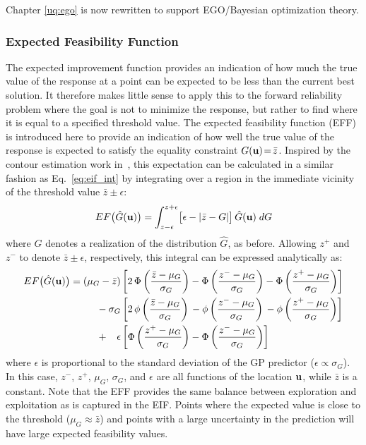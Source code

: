 Chapter \ref{uq:ego} is now rewritten to support EGO/Bayesian optimization theory.

\subsubsection{Expected Feasibility Function}\label{uq:reliability:global:ego:eff}

The expected improvement function provides an indication of how much the true
value of the response at a point can be expected to be less than the current 
best solution.
It therefore makes little sense to apply this to the forward reliability problem 
where the goal is not to minimize the response, but rather to find where it is 
equal to a specified threshold value.
The expected feasibility function (EFF) is introduced here to provide an 
indication of how well the true value of the response is expected to satisfy 
the equality constraint $G({\bf u})\!=\!\bar{z}$.
Inspired by the contour estimation work in~\cite{Ran08}, this 
expectation can be calculated in a similar fashion as Eq.~\ref{eq:eif_int}
by integrating over a region in the immediate vicinity of the threshold value 
$\bar{z}\pm\epsilon$:
\begin{equation}
EF\bigl( \hat{G}({\bf u}) \bigr) = 
  \int_{z-\epsilon}^{z+\epsilon} 
    \bigl[ \epsilon - | \bar{z}-G | \bigr] \, \hat{G}({\bf u}) \; dG
\end{equation}
\noindent where $G$ denotes a realization of the distribution $\hat{G}$, as
before.
Allowing $z^+$ and $z^-$ to denote $\bar{z}\pm\epsilon$, respectively, this 
integral can be expressed analytically as:
\begin{align}
EF\bigl( \hat{G}({\bf u}) \bigr) &= \left( \mu_G - \bar{z} \right)
           \left[ 2 \, \Phi\left( \frac{\bar{z} - \mu_G}{\sigma_G} \right) -
                       \Phi\left( \frac{  z^-   - \mu_G}{\sigma_G} \right) -
                       \Phi\left( \frac{  z^+   - \mu_G}{\sigma_G} \right) 
          \right] \notag \\ & \ \ \ \ \ \ \ \ - 
  \sigma_G \left[ 2 \, \phi\left( \frac{\bar{z} - \mu_G}{\sigma_G} \right) \, -
                       \phi\left( \frac{  z^-   - \mu_G}{\sigma_G} \right) \, -
                       \phi\left( \frac{  z^+   - \mu_G}{\sigma_G} \right) 
          \right] \notag \\ & \ \ \ \ \ \ \ \ + \ \ \,
  \epsilon \left[      \Phi\left( \frac{  z^+   - \mu_G}{\sigma_G} \right) -
                       \Phi\left( \frac{  z^-   - \mu_G}{\sigma_G} \right)
          \right] \label{eq:eff}
\end{align}
where $\epsilon$ is proportional to the standard deviation of the GP 
predictor ($\epsilon\propto\sigma_G$).
In this case, $z^-$, $z^+$, $\mu_G$, $\sigma_G$, and $\epsilon$ are all functions of the 
location ${\bf u}$, while $\bar{z}$ is a constant.
Note that the EFF provides the same balance between exploration and 
exploitation as is captured in the EIF.
Points where the expected value is close to the threshold 
($\mu_G\!\approx\!\bar{z}$) and points with a large uncertainty in the 
prediction will have large expected feasibility values.
